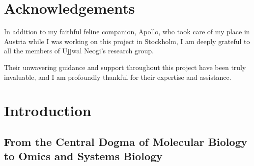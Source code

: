 \documentclass[
  11pt,
]{article}
\begin{document}
\newpage

\section*{Acknowledgements}

In addition to my faithful feline companion, Apollo, who took care of my place in Austria while I was working on this project in Stockholm, I am deeply grateful to all the members of Ujjwal Neogi's research group.

Their unwavering guidance and support throughout this project have been truly invaluable, and I am profoundly thankful for their expertise and assistance.

\newpage

\hypertarget{introduction}{%
\section{Introduction}\label{introduction}}

\hypertarget{from-the-central-dogma-of-molecular-biology-to-omics-and-systems-biology}{%
\subsection{From the Central Dogma of Molecular Biology to Omics and Systems Biology}\label{from-the-central-dogma-of-molecular-biology-to-omics-and-systems-biology}}
\end{document}
